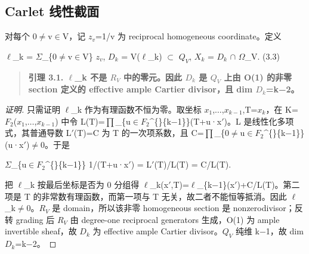 \documentclass[11pt]{ctexart}
\begin{document}
\subsection{Carlet 线性截面}

对每个 0\ensuremath{\ne}v\ensuremath{\in}V，记 \ensuremath{z_{v}}=1/v 为 reciprocal homogeneous coordinate。定义

\ensuremath{\ell}\_k = \ensuremath{\Sigma}\_\{0\ensuremath{\ne}v\ensuremath{\in}V\} \ensuremath{z_{v}},    \ensuremath{D_{k}} = V(\ensuremath{\ell}\_k) \ensuremath{\subset} \ensuremath{Q_{V}},    \ensuremath{X_{k}} = \ensuremath{D_{k}} \ensuremath{\cap} \ensuremath{\Omega}\_V.    (3.3)

\begin{quote}\textbf{引理 3.1. \ensuremath{\ell}\_k 不是 \ensuremath{R_{V}} 中的零元。因此 \ensuremath{D_{k}} 是 \ensuremath{Q_{V}} 上由 O(1) 的非零 section 定义的 effective ample Cartier divisor，且 dim \ensuremath{D_{k}}=k−2。}\end{quote}

\begin{proof}[证明] 

只需证明 \ensuremath{\ell}\_k 作为有理函数不恒为零。取坐标 \ensuremath{x_1},\ensuremath{\ldots},\ensuremath{x_{k−1}},T=\ensuremath{x_{k}}，在 K=\ensuremath{F_2}(\ensuremath{x_1},\ensuremath{\ldots},\ensuremath{x_{k−1}}) 中令 L(T)=\ensuremath{\prod}\_\{u\ensuremath{\in}\ensuremath{F_2}\textasciicircum\{\}\{k−1\}\}(T+u·x\ensuremath{\prime})。L 是线性化多项式，其普通导数 L\ensuremath{\prime}(T)=C 为 T 的一次项系数，且 C=\ensuremath{\prod}\_\{0\ensuremath{\ne}u\ensuremath{\in}\ensuremath{F_2}\textasciicircum\{\}\{k−1\}\}(u·x\ensuremath{\prime})\ensuremath{\ne}0。于是

\ensuremath{\Sigma}\_\{u\ensuremath{\in}\ensuremath{F_2}\textasciicircum\{\}\{k−1\}\} 1/(T+u·x\ensuremath{\prime}) = L\ensuremath{\prime}(T)/L(T) = C/L(T).

把 \ensuremath{\ell}\_k 按最后坐标是否为 0 分组得 \ensuremath{\ell}\_k(x\ensuremath{\prime},T)=\ensuremath{\ell}\_\{k−1\}(x\ensuremath{\prime})+C/L(T)。第二项是 T 的非常数有理函数，而第一项与 T 无关，故二者不能恒等抵消。因此 \ensuremath{\ell}\_k\ensuremath{\ne}0。\ensuremath{R_{V}} 是 domain，所以该非零 homogeneous section 是 nonzerodivisor；反转 grading 后 \ensuremath{R_{V}} 由 degree-one reciprocal generators 生成，O(1) 为 ample invertible sheaf，故 \ensuremath{D_{k}} 为 effective ample Cartier divisor。\ensuremath{Q_{V}} 纯维 k−1，故 dim \ensuremath{D_{k}}=k−2。

\end{proof}
\end{document}
